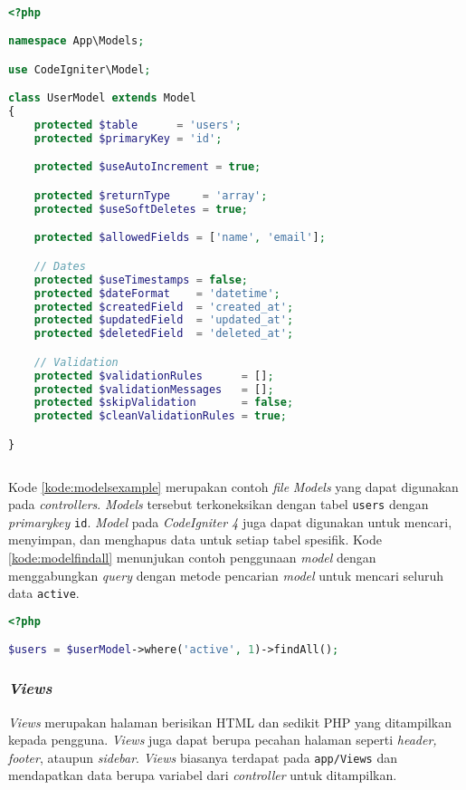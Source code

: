 \begin{lstlisting}[language=PHP, caption=Contoh \textit{Models},label=kode:modelsexample]

<?php

namespace App\Models;

use CodeIgniter\Model;

class UserModel extends Model
{
    protected $table      = 'users';
    protected $primaryKey = 'id';

    protected $useAutoIncrement = true;

    protected $returnType     = 'array';
    protected $useSoftDeletes = true;

    protected $allowedFields = ['name', 'email'];

    // Dates
    protected $useTimestamps = false;
    protected $dateFormat    = 'datetime';
    protected $createdField  = 'created_at';
    protected $updatedField  = 'updated_at';
    protected $deletedField  = 'deleted_at';

    // Validation
    protected $validationRules      = [];
    protected $validationMessages   = [];
    protected $skipValidation       = false;
    protected $cleanValidationRules = true;

}
    
\end{lstlisting}

Kode \ref{kode:modelsexample} merupakan contoh \textit{file} \textit{Models} yang dapat digunakan pada \textit{controllers}. \textit{Models} tersebut terkoneksikan dengan tabel \texttt{users} dengan \textit{primarykey} \texttt{id}. \textit{Model} pada \textit{CodeIgniter 4} juga dapat digunakan untuk mencari, menyimpan, dan menghapus data untuk setiap tabel spesifik. Kode \ref{kode:modelfindall} menunjukan contoh penggunaan \textit{model} dengan menggabungkan \textit{query} dengan metode pencarian \textit{model} untuk mencari seluruh data \verb|active|.
\begin{lstlisting}[language=PHP, caption=Contoh penggunaan \textit{model} untuk mencari data spesifik,label=kode:modelfindall]
<?php

$users = $userModel->where('active', 1)->findAll();
\end{lstlisting}

\subsubsection{\textit{Views}}

\textit{Views} merupakan halaman berisikan HTML dan sedikit PHP yang ditampilkan kepada pengguna. \textit{Views} juga dapat berupa pecahan halaman seperti \textit{header, footer}, ataupun \textit{sidebar}. \textit{Views} biasanya terdapat pada \verb|app/Views| dan mendapatkan data berupa variabel dari \textit{controller} untuk ditampilkan.

